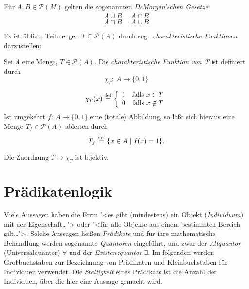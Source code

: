 \begin{lemma}
   Für $A,B \in \mathcal{P}(M)$ gelten die sogenannten \textit{DeMorgan'schen Gesetze}:
   \[ \overline{A \cup B} = \overline{A} \cap \overline{B}\]
   \[ \overline{A \cap B} = \overline{A} \cup \overline{B}\]
\end{lemma}

Es ist üblich,
Teilmengen $T \subseteq \mathcal{P}(A)$ durch sog.\ \emph{charakteristische
Funktionen} dar\-zu\-stel\-len:

\begin{definition}\label{def:charfunction}
 Sei $A$ eine Menge, $T \in \mathcal{P}(A)$. Die \emph{charakteristische
    Funk\-tion von T} ist definiert durch
    \[ \chi_T:\ A \longrightarrow \{0,1\}\]

    \[\chi_T(x) \stackrel{\rm def}{=} \left \{ \begin{array}{ll}
                                1 & \textrm{falls\ } x \in T\\
                                0 & \textrm{falls\ } x \not \in T
                              \end{array}
                     \right . \]
    Ist umgekehrt $f:\ A \rightarrow \{0,1\}$ eine (totale) Abbildung, so läßt
    sich hieraus eine Menge $T_f \in \mathcal{P}(A)$ ableiten durch
    \[ T_f \stackrel{\rm def}{=} \{x \in A \mid f(x) = 1\} .\]
\end{definition}

\noindent Die Zuordnung $T \mapsto \chi_T$ ist bijektiv. 


\section{Prädikatenlogik}
\label{sec:praedikate}

Viele Aussagen haben die Form "<es gibt (mindestens) ein Objekt
(\emph{Individuum}) mit der Eigenschaft\ldots"> oder "<für alle
Objekte aus einem bestimmten Be\-reich gilt\ldots">.  Solche Aussagen heißen
\emph{Prädikate} 
 und für ihre mathematische Behandlung
werden sogenannte \emph{Quantoren} eingeführt, und zwar der \emph{All\-quan\-tor}
(Universalquantor) $\forall$  und der \emph{Existenzquantor}
$\exists$.  Im folgenden werden Großbuchstaben zur Bezeichnung
von Prädikaten und Kleinbuchstaben für Individuen verwendet. Die \emph{Stelligkeit} eines Prädikats ist die Anzahl der Individuen, über die hier
eine Aussage gemacht wird.

